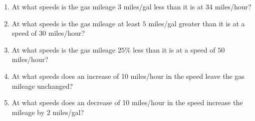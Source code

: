 \documentclass{ximera}
\newcommand{\pskip}{\vskip 0.1 in}
\begin{document}
\begin{example}
\begin{enumerate}
\item At what speeds is the gas mileage $3$ miles/gal less than it is at 34 miles/hour?

\item At what speeds is the gas mileage at least $5$ miles/gal greater than it is at a speed of $30$ miles/hour?

\item At what speeds is the gas mileage $25\%$ less than it is at a speed of $50$ miles/hour?







\item At what speeds does an increase of 10 miles/hour in the speed leave the gas mileage unchanged?

\item At what speeds does an decrease of 10 miles/hour in the speed increase the mileage by 2 miles/gal?

\end{enumerate}
\end{example}
\end{document}
